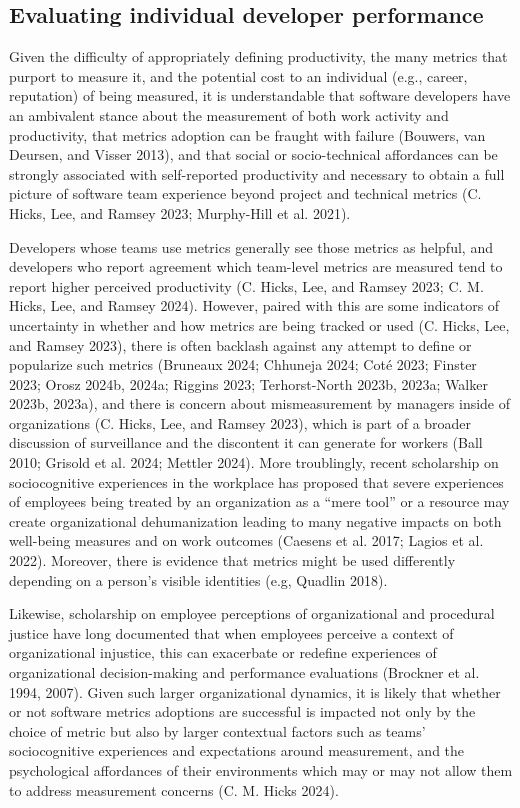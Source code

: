 \documentclass[
]{article}
\begin{document}
\subsection{Evaluating individual developer
performance}\label{evaluating-individual-developer-performance}

Given the difficulty of appropriately defining productivity, the many
metrics that purport to measure it, and the potential cost to an
individual (e.g., career, reputation) of being measured, it is
understandable that software developers have an ambivalent stance about
the measurement of both work activity and productivity, that metrics
adoption can be fraught with failure (Bouwers, van Deursen, and Visser
2013), and that social or socio-technical affordances can be strongly
associated with self-reported productivity and necessary to obtain a
full picture of software team experience beyond project and technical
metrics (C. Hicks, Lee, and Ramsey 2023; Murphy-Hill et al. 2021).

Developers whose teams use metrics generally see those metrics as
helpful, and developers who report agreement which team-level metrics
are measured tend to report higher perceived productivity (C. Hicks,
Lee, and Ramsey 2023; C. M. Hicks, Lee, and Ramsey 2024). However,
paired with this are some indicators of uncertainty in whether and how
metrics are being tracked or used (C. Hicks, Lee, and Ramsey 2023),
there is often backlash against any attempt to define or popularize such
metrics (Bruneaux 2024; Chhuneja 2024; Coté 2023; Finster 2023; Orosz
2024b, 2024a; Riggins 2023; Terhorst-North 2023b, 2023a; Walker 2023b,
2023a), and there is concern about mismeasurement by managers inside of
organizations (C. Hicks, Lee, and Ramsey 2023), which is part of a
broader discussion of surveillance and the discontent it can generate
for workers (Ball 2010; Grisold et al. 2024; Mettler 2024). More
troublingly, recent scholarship on sociocognitive experiences in the
workplace has proposed that severe experiences of employees being
treated by an organization as a ``mere tool'' or a resource may create
organizational dehumanization leading to many negative impacts on both
well-being measures and on work outcomes (Caesens et al. 2017; Lagios et
al. 2022). Moreover, there is evidence that metrics might be used
differently depending on a person's visible identities (e.g, Quadlin
2018).

Likewise, scholarship on employee perceptions of organizational and
procedural justice have long documented that when employees perceive a
context of organizational injustice, this can exacerbate or redefine
experiences of organizational decision-making and performance
evaluations (Brockner et al. 1994, 2007). Given such larger
organizational dynamics, it is likely that whether or not software
metrics adoptions are successful is impacted not only by the choice of
metric but also by larger contextual factors such as teams'
sociocognitive experiences and expectations around measurement, and the
psychological affordances of their environments which may or may not
allow them to address measurement concerns (C. M. Hicks 2024).
\end{document}
